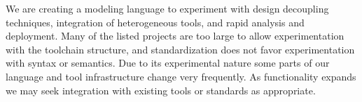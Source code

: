 We are creating a modeling language to experiment with design decoupling 
techniques, integration of heterogeneous tools, 
and rapid analysis and deployment.  Many of the 
listed projects are too large to allow 
experimentation with the toolchain structure, and 
standardization does not favor experimentation 
with syntax or semantics.  Due to its experimental nature 
some parts of our language and tool infrastructure 
change very frequently.  As functionality expands we 
may seek integration with existing tools or standards as appropriate.


